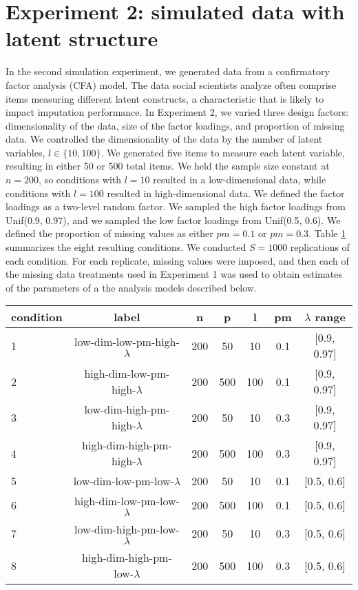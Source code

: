 \section{Experiment 2: simulated data with latent structure}

In the second simulation experiment, we generated data from a confirmatory factor analysis (CFA) model.
The data social scientists analyze often comprise items measuring different latent constructs, 
a characteristic that is likely to impact imputation performance.
In Experiment 2, we varied three design factors: dimensionality of the data, size of the factor loadings, and proportion of missing data.
We controlled the dimensionality of the data by the number of latent variables, $l \in \{10, 100\}$.
We generated five items to measure each latent variable, resulting in either 50 or 500 total items. We held the sample size constant at $n=200$, so conditions with $l = 10$ resulted in a low-dimensional data, while conditions 
with $l = 100$ resulted in high-dimensional data.
We defined the factor loadings as a two-level random factor.
We sampled the high factor loadings from Unif(0.9, 0.97), and we sampled the low factor loadings from Unif(0.5, 0.6).
We defined the proportion of missing values as either $pm = 0.1$ or $pm = 0.3$.
Table \ref{tab:condExp2} summarizes the eight resulting conditions. We conducted $S = 1000$ replications of each condition. For each replicate, missing values were imposed, and then each of the missing data treatments used in Experiment 1 was used to obtain estimates of the parameters of a the analysis models described below.

\begin{table}
	{
	\begin{tabular}{l c c c c c c } 
		\toprule
		condition & label & n & p & l & pm & $\lambda$ range \\
		\midrule
		1 & low-dim-low-pm-high-$\lambda$ & 200 & 50 &  10 &  0.1 & [0.9, 0.97] \\
		2 & high-dim-low-pm-high-$\lambda$ & 200 & 500 & 100 & 0.1 & [0.9, 0.97] \\
		3 & low-dim-high-pm-high-$\lambda$ & 200 & 50 &  10 &  0.3 & [0.9, 0.97] \\
		4 & high-dim-high-pm-high-$\lambda$ & 200 & 500 & 100 & 0.3 & [0.9, 0.97] \\
		5 & low-dim-low-pm-low-$\lambda$ & 200 & 50 &  10 &  0.1 & [0.5, 0.6]  \\
		6 & high-dim-low-pm-low-$\lambda$ & 200 & 500 & 100 & 0.1 & [0.5, 0.6]  \\
		7 & low-dim-high-pm-low-$\lambda$ & 200 & 50 &  10 &  0.3 & [0.5, 0.6]  \\
		8 & high-dim-high-pm-low-$\lambda$ & 200 & 500 & 100 & 0.3 & [0.5, 0.6]  \\
		\bottomrule
	\end{tabular}
	}
\label{tab:condExp2}
\end{table}

